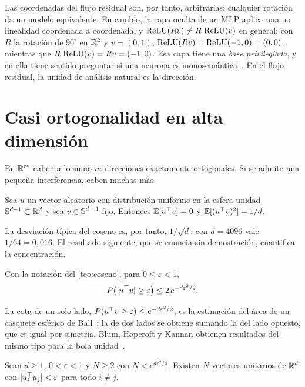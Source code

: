 Las coordenadas del flujo residual son, por tanto, arbitrarias: cualquier rotación da un modelo equivalente. En cambio, la capa oculta de un MLP aplica una no linealidad coordenada a coordenada, y $\operatorname{ReLU}(Rv)\neq R\,\operatorname{ReLU}(v)$ en general: con $R$ la rotación de $90^\circ$ en $\mathbb{R}^{2}$ y $v=(0,1)$, $\operatorname{ReLU}(Rv)=\operatorname{ReLU}(-1,0)=(0,0)$, mientras que $R\,\operatorname{ReLU}(v)=Rv=(-1,0)$. Esa capa tiene una \emph{base privilegiada}, y en ella tiene sentido preguntar si una neurona es monosemántica~\cite[«Privileged vs Non-privileged Bases»]{elhage22}. En el flujo residual, la unidad de análisis natural es la dirección.

\section{Casi ortogonalidad en alta dimensión}

En $\mathbb{R}^{m}$ caben a lo sumo $m$ direcciones exactamente ortogonales. Si se admite una pequeña interferencia, caben muchas más.

\begin{teorema}\label{teo:coseno}
Sea $u$ un vector aleatorio con distribución uniforme en la esfera unidad $\mathbb{S}^{d-1}\subset\mathbb{R}^{d}$ y sea $v\in\mathbb{S}^{d-1}$ fijo. Entonces $\mathbb{E}[u^{\top} v]=0$ y $\mathbb{E}[(u^{\top} v)^{2}]=1/d$.
\end{teorema}

La desviación típica del coseno es, por tanto, $1/\sqrt{d}$: con $d=4096$ vale $1/64=0{,}016$. El resultado siguiente, que se enuncia sin demostración, cuantifica la concentración.

\begin{lema}\label{lem:casquete}
Con la notación del \cref{teo:coseno}, para $0\le\varepsilon<1$,
\[
P\bigl(\lvert u^{\top} v\rvert\ge\varepsilon\bigr)\le 2\,e^{-d\varepsilon^{2}/2}.
\]
\end{lema}

La cota de un solo lado, $P(u^{\top} v\ge\varepsilon)\le e^{-d\varepsilon^{2}/2}$, es la estimación del área de un casquete esférico de Ball~\cite{ball}; la de dos lados se obtiene sumando la del lado opuesto, que es igual por simetría. Blum, Hopcroft y Kannan obtienen resultados del mismo tipo para la bola unidad~\cite[cap.~2]{bhk}.

\begin{corolario}\label{cor:casi-ortogonales}
Sean $d\ge 1$, $0<\varepsilon<1$ y $N\ge 2$ con $N<e^{d\varepsilon^{2}/4}$. Existen $N$ vectores unitarios de $\mathbb{R}^{d}$ con $\lvert u_i^{\top} u_j\rvert<\varepsilon$ para todo $i\neq j$.
\end{corolario}

